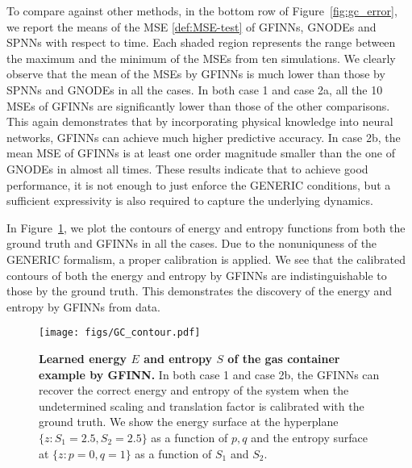 \documentclass[openacc]{rsproca_new}%
\begin{document}
To compare against other methods,
in the bottom row of Figure~\ref{fig:gc_error},
we report the means of the MSE \eqref{def:MSE-test}
of GFINNs, GNODEs and SPNNs 
with respect to time.
Each shaded region 
represents the range between the maximum and the minimum of the MSEs from ten simulations.
We clearly observe that 
the mean of the MSEs by GFINNs 
is much lower than 
those by SPNNs and GNODEs in all the cases.
In both case 1 and case 2a, 
all the 10 MSEs of GFINNs are 
significantly lower than those of the other comparisons.
This again demonstrates that by incorporating physical knowledge into neural networks, 
GFINNs can achieve much higher predictive accuracy.
In case 2b, 
the mean MSE of GFINNs is at least 
one order magnitude smaller than
the one of GNODEs 
in almost all times.
These results indicate 
that to achieve 
good performance,
it is not enough to just 
enforce the GENERIC conditions,
but a sufficient expressivity is
also required 
to capture the underlying dynamics.





In Figure~\ref{fig:gc_contour},
we plot 
the contours of energy and entropy
functions from 
both the ground truth
and GFINNs in all the cases.
Due to the nonuniquness of 
the GENERIC formalism, 
a proper calibration is applied.
We see that the calibrated contours of 
both the energy and entropy
by GFINNs are indistinguishable
to those by the ground truth.
This demonstrates the discovery of the energy and entropy by GFINNs from data.

\begin{figure}[ht]
    \centering
    \texttt{[image: figs/GC\_contour.pdf]}
    \caption{\textbf{Learned energy $E$ and entropy $S$ of the gas container example by GFINN.} In both case 1 and case 2b, the GFINNs can recover the correct energy and entropy of the system when the undetermined scaling and translation factor is calibrated with the ground truth. We show the energy surface at the hyperplane $\{z:S_1=2.5,S_2=2.5\}$ as a function of $p,q$ and the entropy surface at $\{z:p=0,q=1\}$ as a function of $S_1$ and $S_2$.}
    \label{fig:gc_contour}
\end{figure}
 
\end{document}
